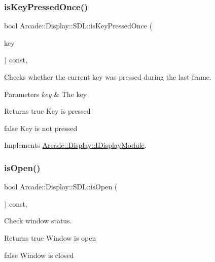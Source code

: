 \subsubsection{\texorpdfstring{isKeyPressedOnce()}{isKeyPressedOnce()}}
{\footnotesize\ttfamily bool Arcade\+::\+Display\+::\+S\+D\+L\+::is\+Key\+Pressed\+Once (\begin{DoxyParamCaption}\item[{\mbox{\hyperlink{classArcade_1_1Display_1_1IDisplayModule_a8da3f6b309ca0581473ae8cc8789b619}{I\+Display\+Module\+::\+Keys}}}]{key }\end{DoxyParamCaption}) const\hspace{0.3cm}{\ttfamily [final]}, {\ttfamily [virtual]}}



Checks whether the current key was pressed during the last frame. 


\begin{DoxyParams}{Parameters}
{\em key} & The key \\
\hline
\end{DoxyParams}
\begin{DoxyReturn}{Returns}
true Key is pressed 

false Key is not pressed 
\end{DoxyReturn}


Implements \mbox{\hyperlink{classArcade_1_1Display_1_1IDisplayModule_a531b700b332e077d9b714bafac05ebe1}{Arcade\+::\+Display\+::\+I\+Display\+Module}}.

\mbox{\label{classArcade_1_1Display_1_1SDL_a7d86c934d5dde9283e9c70816cf9c8a5}} 
\subsubsection{\texorpdfstring{isOpen()}{isOpen()}}
{\footnotesize\ttfamily bool Arcade\+::\+Display\+::\+S\+D\+L\+::is\+Open (\begin{DoxyParamCaption}{ }\end{DoxyParamCaption}) const\hspace{0.3cm}{\ttfamily [final]}, {\ttfamily [virtual]}}



Check window status. 

\begin{DoxyReturn}{Returns}
true Window is open 

false Window is closed 
\end{DoxyReturn}



